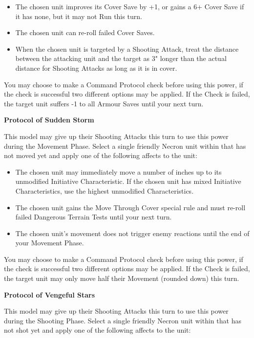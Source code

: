 \begin{multicols}{2}
\begin{itemize}
	\itemsep 0pt
	\item The chosen unit improves its Cover Save by +1, or gains a 6+ Cover Save if it has none, but it may not Run this turn.
	\item The chosen unit can re-roll failed Cover Saves.
	\item When the chosen unit is targeted by a Shooting Attack, treat the distance between the attacking unit and the target as 3" longer than the actual distance for Shooting Attacks as long as it is in cover.
\end{itemize}

You may choose to make a Command Protocol check before using this power, if the check is successful two different options may be applied. If the Check is failed, the target unit suffers -1 to all Armour Saves until your next turn.

\textbf{Protocol of Sudden Storm}

This model may give up their Shooting Attacks this turn to use this power during the Movement Phase. Select a single friendly Necron unit within  that has not moved yet and apply one of the following affects to the unit:

\begin{itemize}
	\itemsep 0pt
	\item The chosen unit may immediately move a number of inches up to its unmodified Initiative Characteristic. If the chosen unit has mixed Initiative Characteristics, use the highest unmodified Characteristics.
	\item The chosen unit gains the Move Through Cover special rule and must re-roll failed Dangerous Terrain Tests until your next turn.
	\item The chosen unit's movement does not trigger enemy reactions until the end of your Movement Phase.
\end{itemize}

You may choose to make a Command Protocol check before using this power, if the check is successful two different options may be applied. If the Check is failed, the target unit may only move half their Movement (rounded down) this turn.

\textbf{Protocol of Vengeful Stars}

This model may give up their Shooting Attacks this turn to use this power during the Shooting Phase. Select a single friendly Necron unit within  that has not shot yet and apply one of the following affects to the unit:


\end{multicols}
